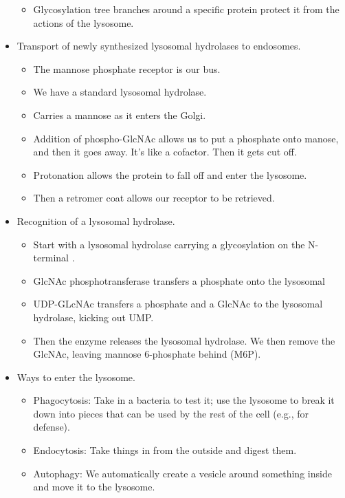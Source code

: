 \documentclass[../notes.tex]{subfiles}
\begin{document}
\begin{itemize}
\begin{itemize}
        \item Glycosylation tree branches around a specific protein protect it from the actions of the lysosome.
    \end{itemize}
    \item Transport of newly synthesized lysosomal hydrolases to endosomes.
    \begin{itemize}
        \item The mannose phosphate receptor is our bus.
        \item We have a standard lysosomal hydrolase.
        \item Carries a mannose as it enters the Golgi.
        \item Addition of phospho-GlcNAc allows us to put a phosphate onto manose, and then it goes away. It's like a cofactor. Then it gets cut off.
        \item Protonation allows the protein to fall off and enter the lysosome.
        \item Then a retromer coat allows our receptor to be retrieved.
    \end{itemize}
    \item Recognition of a lysosomal hydrolase.
    \begin{itemize}
        \item Start with a lysosomal hydrolase carrying a glycosylation on the N-terminal .
        \item GlcNAc phosphotransferase transfers a phosphate onto the lysosomal
        \item UDP-GLcNAc transfers a phosphate and a GlcNAc to the lysosomal hydrolase, kicking out UMP.
        \item Then the enzyme releases the lysosomal hydrolase. We then remove the GlcNAc, leaving mannose 6-phosphate behind (M6P).
    \end{itemize}
    \item Ways to enter the lysosome.
    \begin{itemize}
        \item Phagocytosis: Take in a bacteria to test it; use the lysosome to break it down into pieces that can be used by the rest of the cell (e.g., for defense).
        \item Endocytosis: Take things in from the outside and digest them.
        \item Autophagy: We automatically create a vesicle around something inside and move it to the lysosome.
    \end{itemize}

\end{itemize}
\end{document}
